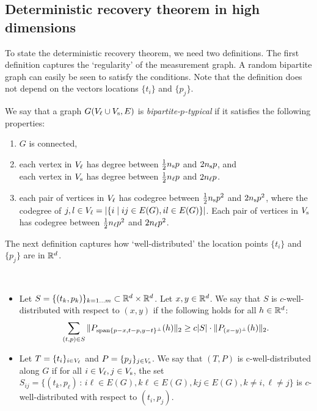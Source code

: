 

\subsection{Deterministic recovery theorem in high dimensions} \label{sec-deterministic-theorem}

To state the deterministic recovery theorem, we need two definitions.
The first definition captures the `regularity' of the measurement graph. A random bipartite graph can easily be seen to satisfy the conditions. Note that the definition does not depend on the vectors locations $\{t_i\}$ and $\{p_j\}$.

\begin{definition}
We say that a graph $G(V_\ell \cup V_\text{s},E)$ is \emph{bipartite-$p$-typical} if it satisfies the following
properties:
\begin{enumerate}
  \setlength{\itemsep}{1pt} \setlength{\parskip}{0pt}
  \setlength{\parsep}{0pt}
	\item $G$ is connected,
	\item each vertex in $V_\ell$ has degree between $\frac{1}{2}n_\text{s} p$ and $2n_\text{s} p$, and\\ each vertex in $V_\text{s}$ has degree between $\frac{1}{2}n_\ell p$ and $2 n_\ell p$.
	\item each pair of vertices in $V_\ell$ has codegree between $\frac{1}{2}n_\text{s} p^2$ and $2 n_\text{s} p^2$, where the codegree  of $j,l \in V_\ell = |\{i \mid ij \in E(G), il \in E(G) \} |$.  Each pair of vertices in $V_\text{s}$ has codegree between $\frac{1}{2}n_\ell p^2$ and $2 n_\ell p^2$.
\end{enumerate}
\end{definition}


The next definition captures how `well-distributed' the location points $\{t_i\}$ and $\{p_j\}$ are in $\mathbb{R}^d$.  

\begin{definition} \ 
\begin{itemize}
  \setlength{\itemsep}{1pt} \setlength{\parskip}{0pt}
  \setlength{\parsep}{0pt}
\item[(i)] Let $S = \{(t_k, p_k)\}_{k=1\ldots m} \subset \mathbb{R}^d \times \mathbb{R}^d$. Let $x,y \in \mathbb{R}^d$.
We say that $S$ is $c$-well-distributed with respect to $(x,y)$ if the following holds for all $h \in \mathbb{R}^d$:
\[
	\sum_{(t,p) \in S}\|P_{\operatorname{span}\{p-x,t-p, y-t\}^{\perp}}(h)\|_2 \ge c|S|\cdot\|P_{(x-y)^{\perp}}(h)\|_2.
\]
\item[(ii)] Let $T = \{t_{i}\}_{i \in V_\ell}$ and $P = \{p_j\}_{j \in V_\text{s}}$.  We say that $(T,P)$ is c-well-distributed along $G$ if for all $i \in V_\ell, j \in V_\text{s}$, the set $S_{ij} = \{(t_k, p_\ell)\,:\, i\ell \in E(G), k\ell \in E(G), kj \in E(G), k \neq i, \ell \neq j \}$ is $c$-well-distributed with respect to $(t_i, p_j)$.
\end{itemize}
\end{definition}


